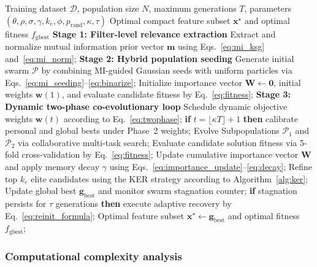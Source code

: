\begin{algorithm}[!htb]
\small
\caption{Overall algorithmic framework of KDS-EL}
\label{alg:kds_el}
\begin{algorithmic}[1]
\Require Training dataset $\mathcal{D}$, population size $N$, maximum generations $T$, parameters $(\theta, \rho, \sigma, \gamma, k_e, \phi, p_{\mathrm{rand}}, \kappa, \tau)$
\Ensure Optimal compact feature subset $\mathbf{x}^{\star}$ and optimal fitness $f_{\mathrm{gbest}}$
\Statex \textbf{Stage 1: Filter-level relevance extraction}
\State Extract and normalize mutual information prior vector $\mathbf{m}$ using Eqs.~\eqref{eq:mi_ksg} and~\eqref{eq:mi_norm};
\Statex \textbf{Stage 2: Hybrid population seeding}
\State Generate initial swarm $\mathcal{P}$ by combining MI-guided Gaussian seeds with uniform particles via Eqs.~\eqref{eq:mi_seeding}--\eqref{eq:binarize};
\State Initialize importance vector $\mathbf{W} \leftarrow \mathbf{0}$, initial weights $\mathbf{w}(1)$, and evaluate candidate fitness by Eq.~\eqref{eq:fitness};
\Statex \textbf{Stage 3: Dynamic two-phase co-evolutionary loop}
    \State Schedule dynamic objective weights $\mathbf{w}(t)$ according to Eq.~\eqref{eq:twophase};
    \State \textbf{if} $t = \lfloor \kappa T \rfloor + 1$ \textbf{then} calibrate personal and global bests under Phase~2 weights;
    \State Evolve Subpopulations $\mathcal{P}_1$ and $\mathcal{P}_2$ via collaborative multi-task search;
    \State Evaluate candidate solution fitness via 5-fold cross-validation by Eq.~\eqref{eq:fitness};
    \State Update cumulative importance vector $\mathbf{W}$ and apply memory decay $\gamma$ using Eqs.~\eqref{eq:importance_update}--\eqref{eq:decay};
    \State Refine top $k_e$ elite candidates using the KER strategy according to Algorithm~\ref{alg:ker};
    \State Update global best $\mathbf{g}_{\mathrm{best}}$ and monitor swarm stagnation counter;
    \State \textbf{if} stagnation persists for $\tau$ generations \textbf{then} execute adaptive recovery by Eq.~\eqref{eq:reinit_formula};
\EndFor
\State \Return Optimal feature subset $\mathbf{x}^{\star} \leftarrow \mathbf{g}_{\mathrm{best}}$ and optimal fitness $f_{\mathrm{gbest}}$;
\end{algorithmic}
\end{algorithm}

\subsubsection{Computational complexity analysis}

